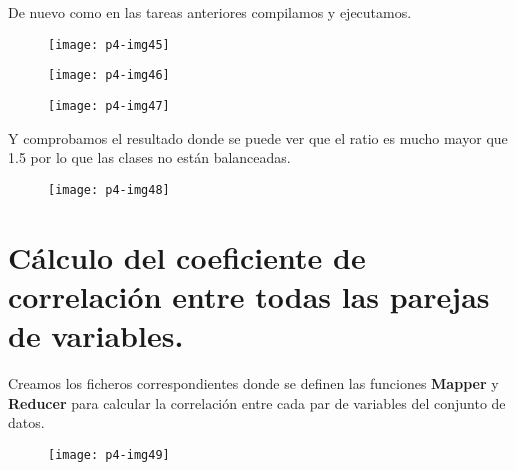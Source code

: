 \documentclass[10pt]{article}
\begin{document}
De nuevo como en las tareas anteriores compilamos y ejecutamos. \\

\begin{figure}[H]
	\begin{center}
 		\texttt{[image: p4-img45]}
	\end{center} 
\end{figure}

\begin{figure}[H]
	\begin{center}
 		\texttt{[image: p4-img46]}
	\end{center} 
\end{figure}

\begin{figure}[H]
	\begin{center}
 		\texttt{[image: p4-img47]}
	\end{center} 
\end{figure}

Y comprobamos el resultado donde se puede ver que el ratio es mucho mayor que 1.5 por lo que las clases no están balanceadas. \\

\begin{figure}[H]
	\begin{center}
 		\texttt{[image: p4-img48]}
	\end{center} 
\end{figure}


\section{Cálculo del coeficiente de correlación entre todas las parejas de variables.} 
Creamos los ficheros correspondientes donde se definen las funciones \textbf{Mapper} y \textbf{Reducer} para calcular la correlación entre cada par de variables del conjunto de datos. \\

\begin{figure}[H]
	\begin{center}
 		\texttt{[image: p4-img49]}
	\end{center} 
\end{figure}
\end{document}
